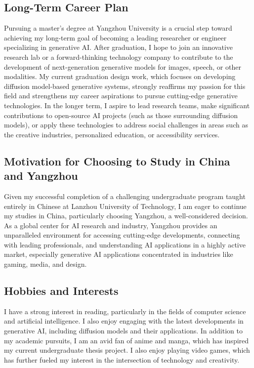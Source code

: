 \documentclass[12pt,a4paper]{article}
\begin{document}
\begin{CJK*}{UTF8}{gbsn}
\subsection*{Long-Term Career Plan}
Pursuing a master's degree at Yangzhou University is a crucial step toward achieving my long-term goal of becoming a leading researcher or engineer specializing in generative AI. After graduation, I hope to join an innovative research lab or a forward-thinking technology company to contribute to the development of next-generation generative models for images, speech, or other modalities. My current graduation design work, which focuses on developing diffusion model-based generative systems, strongly reaffirms my passion for this field and strengthens my career aspirations to pursue cutting-edge generative technologies. In the longer term, I aspire to lead research teams, make significant contributions to open-source AI projects (such as those surrounding diffusion models), or apply these technologies to address social challenges in areas such as the creative industries, personalized education, or accessibility services.

\subsection*{Motivation for Choosing to Study in China and Yangzhou }
Given my successful completion of a challenging undergraduate program taught entirely in Chinese at Lanzhou University of Technology, I am eager to continue my studies in China, particularly choosing Yangzhou, a well-considered decision. As a global center for AI research and industry, Yangzhou provides an unparalleled environment for accessing cutting-edge developments, connecting with leading professionals, and understanding AI applications in a highly active market, especially generative AI applications concentrated in industries like gaming, media, and design. 

\subsection*{Hobbies and Interests}
I have a strong interest in reading, particularly in the fields of computer science and artificial intelligence. I also enjoy engaging with the latest developments in generative AI, including diffusion models and their applications. In addition to my academic pursuits, I am an avid fan of anime and manga, which has inspired my current undergraduate thesis project. I also enjoy playing video games, which has further fueled my interest in the intersection of technology and creativity.


\end{CJK*}
\end{document}
